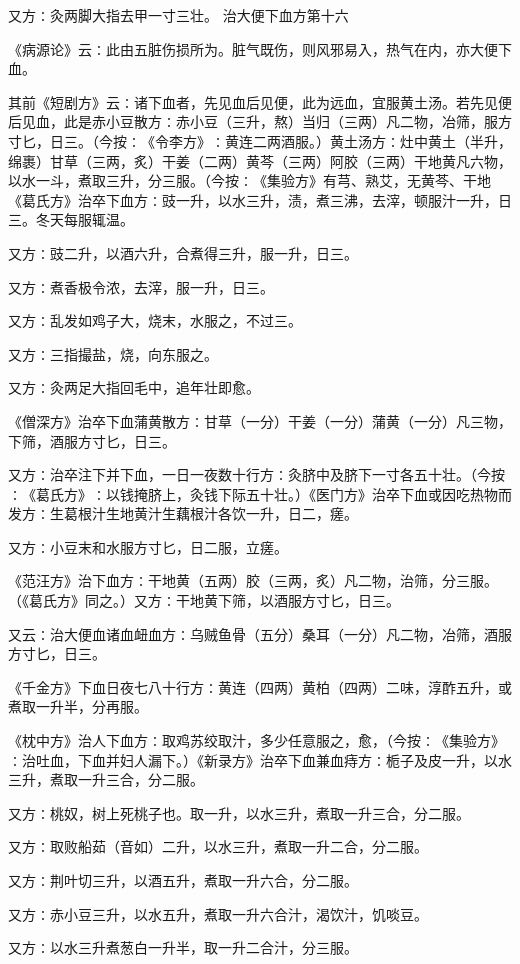\documentclass[a4paper,12pt,UTF8,twoside]{ctexbook}
\begin{document}
又方∶灸两脚大指去甲一寸三壮。
治大便下血方第十六

《病源论》云∶此由五脏伤损所为。脏气既伤，则风邪易入，热气在内，亦大便下血。

其前《短剧方》云∶诸下血者，先见血后见便，此为远血，宜服黄土汤。若先见便后见血，此是赤小豆散方∶赤小豆（三升，熬）当归（三两）凡二物，冶筛，服方寸匕，日三。（今按∶《令李方》∶黄连二两酒服。）黄土汤方∶灶中黄土（半升，绵裹）甘草（三两，炙）干姜（二两）黄芩（三两）阿胶（三两）干地黄凡六物，以水一斗，煮取三升，分三服。（今按∶《集验方》有芎、熟艾，无黄芩、干地《葛氏方》治卒下血方∶豉一升，以水三升，渍，煮三沸，去滓，顿服汁一升，日三。冬天每服辄温。

又方∶豉二升，以酒六升，合煮得三升，服一升，日三。

又方∶煮香极令浓，去滓，服一升，日三。

又方∶乱发如鸡子大，烧末，水服之，不过三。

又方∶三指撮盐，烧，向东服之。

又方∶灸两足大指回毛中，追年壮即愈。

《僧深方》治卒下血蒲黄散方∶甘草（一分）干姜（一分）蒲黄（一分）凡三物，下筛，酒服方寸匕，日三。

又方∶治卒注下并下血，一日一夜数十行方∶灸脐中及脐下一寸各五十壮。（今按∶《葛氏方》∶以钱掩脐上，灸钱下际五十壮。）《医门方》治卒下血或因吃热物而发方∶生葛根汁生地黄汁生藕根汁各饮一升，日二，瘥。

又方∶小豆末和水服方寸匕，日二服，立瘥。

《范汪方》治下血方∶干地黄（五两）胶（三两，炙）凡二物，治筛，分三服。（《葛氏方》同之。）又方∶干地黄下筛，以酒服方寸匕，日三。

又云∶治大便血诸血衄血方∶乌贼鱼骨（五分）桑耳（一分）凡二物，冶筛，酒服方寸匕，日三。

《千金方》下血日夜七八十行方∶黄连（四两）黄柏（四两）二味，淳酢五升，或煮取一升半，分再服。

《枕中方》治人下血方∶取鸡苏绞取汁，多少任意服之，愈，（今按∶《集验方》∶治吐血，下血并妇人漏下。）《新录方》治卒下血兼血痔方∶栀子及皮一升，以水三升，煮取一升三合，分二服。

又方∶桃奴，树上死桃子也。取一升，以水三升，煮取一升三合，分二服。

又方∶取败船茹（音如）二升，以水三升，煮取一升二合，分二服。

又方∶荆叶切三升，以酒五升，煮取一升六合，分二服。

又方∶赤小豆三升，以水五升，煮取一升六合汁，渴饮汁，饥啖豆。

又方∶以水三升煮葱白一升半，取一升二合汁，分三服。
\end{document}
